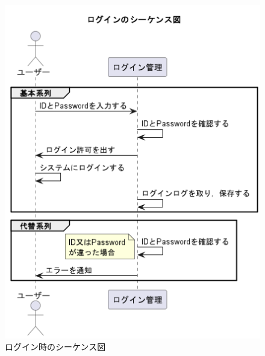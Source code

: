 \documentclass[documentclass]{jsarticle}
\begin{document}
\begin{figure}[H]
  \centering
  \begin{minipage}[b]{0.49\columnwidth}
      \centering
      \includegraphics[width=1.0\columnwidth]{figure/6-1.png}
      \caption{ログイン時のシーケンス図}
      \label{fig:6-1}
  \end{minipage}
  \begin{minipage}[b]{0.49\columnwidth}
      \centering

\end{minipage}
\end{figure}
\end{document}
